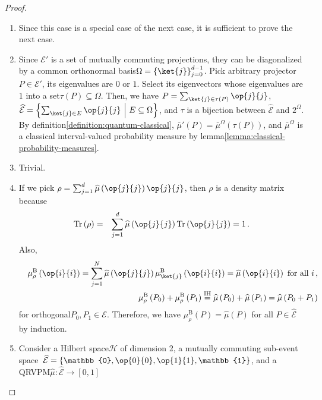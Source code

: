 \documentclass[12pt]{iopart}
\theoremstyle{plain}
\theoremstyle{definition}
\theoremstyle{remark}
\newcommand{\Hilb}{\mathcal{H}}
\newcommand{\events}{\ensuremath{\mathcal{E}}}
\newcommand{\proj}[1]{\op{#1}{#1}}
\newcommand{\set}[2]{\ensuremath{\left\{ {#1}~\middle|~{#2}\right\} }}
\newcommand{\nb}{\nolinebreak[3] }
\begin{document}
\begin{proof}
\begin{enumerate}
\item Since this case is a special case of the next case, it is sufficient
to prove the next case. 
\item Since $\events'$ is a set of mutually commuting projections, they
can be diagonalized by a common orthonormal basis\nb$\Omega=\left\{ \ket{j}\right\} _{j=0}^{d-1}$.
Pick arbitrary projector\nb$P\in\events'$, its eigenvalues are $0$
or $1$. Select its eigenvectors whose eigenvalues are $1$ into a
set\nb$\tau\left(P\right)\subseteq\Omega$. Then, we have $P=\sum_{\ket{j}\in\tau\left(P\right)}\proj{j}$,
$\widehat{\events}=\set{\sum_{\ket{j}\in E}\proj{j}}{E\subseteq\Omega}$,
and $\tau$ is a bijection between $\widehat{\events}$ and $2^{\Omega}$.
By definition\nb\ref{definition:quantum-classical}, $\bar{\mu}'\left(P\right)=\bar{\mu}^{\Omega}\left(\tau\left(P\right)\right)$,
and $\bar{\mu}^{\Omega}$ is a classical interval-valued probability
measure by lemma\nb\ref{lemma:classical-probability-measures}.
\item Trivial.
\item If we pick $\rho=\sum_{j=1}^{d}\widehat{\mu}\left(\proj{j}\right)\proj{j}$,
then $\rho$ is a density matrix because\nb\cite{544199}
\begin{eqnarray}
\Tr\left(\rho\right) & = & \sum_{j=1}^{d}\widehat{\mu}\left(\proj{j}\right)\Tr\left(\proj{j}\right)=1\,.
\end{eqnarray}
Also, 
\begin{eqnarray}
 &  & \mu_{\rho}^{\mathrm{B}}\left(\proj{i}\right)=\sum_{j=1}^{N}\widehat{\mu}\left(\proj{j}\right)\mu_{\ket{j}}^{\mathrm{\mathrm{B}}}\left(\proj{i}\right)=\widehat{\mu}\left(\proj{i}\right)\textrm{ for all }i\,,\\
 &  & \mu_{\rho}^{\mathrm{B}}\left(P_{0}\right)+\mu_{\rho}^{\mathrm{B}}\left(P_{1}\right)\overset{\textrm{IH}}{=}\widehat{\mu}\left(P_{0}\right)+\widehat{\mu}\left(P_{1}\right)=\widehat{\mu}\left(P_{0}+P_{1}\right)
\end{eqnarray}
for orthogonal\nb$P_{0},P_{1}\in\events$. Therefore, we have $\mu_{\rho}^{\mathrm{B}}\left(P\right)=\widehat{\mu}\left(P\right)$
for all $P\in\widehat{\events}$ by induction.
\item Consider a Hilbert space\nb$\Hilb$ of dimension 2, a mutually commuting
sub-event space~$\widehat{\events}=\left\{ \mathbb{0},\proj{0},\proj{1},\mathbb{1}\right\} $,
and a QRVPM\nb$\widehat{\mu}:\widehat{\events}\rightarrow\left[0,1\right]$

\end{enumerate}
\end{proof}
\end{document}
